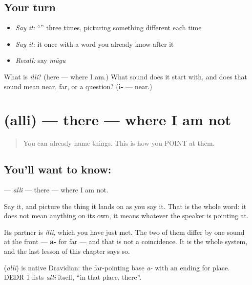 \subsection*{Your turn}
\begin{itemize}
\raggedright
  \item \emph{Say it:} \textquotedblleft{}\textquotedblright{} three times, picturing something different each time
  \item \emph{Say it:} it once with a word you already know after it
  \item \emph{Recall:} say \emph{mūgu}
\end{itemize}

\begin{tcolorbox}[breakable,colback=teal!4,colframe=teal!35!black,title={Before you move on}]
What is \emph{illi}? (here — where I am.) What sound does it start with, and does that sound mean near, far, or a question? (\textbf{i-} — near.)
\end{tcolorbox}
\section[\texorpdfstring{\kn{ಅಲ್ಲಿ} (alli)}{ಅಲ್ಲಿ (alli)}]{ (alli) — there — where I am not}

\label{lesson:KA-C41-there}



\begin{quote}
You can already name things. This is how you POINT at them.
\end{quote}

\subsection*{You'll want to know: }
\textbf{} — \emph{alli} — there — where I am not.

Say it, and picture the thing it lands on as you say it. That is the whole word: it does not mean anything on its own, it means whatever the speaker is pointing at.

Its partner is \textbf{} \emph{illi}, which you have just met. The two of them differ by one sound at the front — \textbf{a-} for far — and that is not a coincidence. It is the whole system, and the last lesson of this chapter says so.

\begin{cousinweb}
\textbf{} (\emph{alli}) is native Dravidian: the far-pointing base \emph{a-} with an ending for place. DEDR 1 lists \emph{alli} itself, \textquotedblleft{}in that place, there\textquotedblright{}.
\end{cousinweb}

